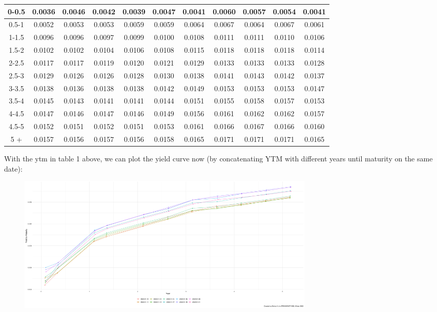 \documentclass[10pt]{article}
\begin{document}
\begin{enumerate}
\begin{enumerate}
\begin{table}[H]
{\begin{tabular}{|c|c|c|c|c|c|c|c|c|c|c|}
                    0-0.5 & 0.0036 & 0.0046 & 0.0042 & 0.0039 & 0.0047 & 0.0041 & 0.0060 & 0.0057 & 0.0054 & 0.0041 \\\hline
                    0.5-1 & 0.0052 & 0.0053 & 0.0053 & 0.0059 & 0.0059 & 0.0064 & 0.0067 & 0.0064 & 0.0067 & 0.0061 \\\hline
                    1-1.5 & 0.0096 & 0.0096 & 0.0097 & 0.0099 & 0.0100 & 0.0108 & 0.0111 & 0.0111 & 0.0110 & 0.0106 \\\hline
                    1.5-2 & 0.0102 & 0.0102 & 0.0104 & 0.0106 & 0.0108 & 0.0115 & 0.0118 & 0.0118 & 0.0118 & 0.0114 \\\hline
                    2-2.5 & 0.0117 & 0.0117 & 0.0119 & 0.0120 & 0.0121 & 0.0129 & 0.0133 & 0.0133 & 0.0133 & 0.0128 \\\hline
                    2.5-3 & 0.0129 & 0.0126 & 0.0126 & 0.0128 & 0.0130 & 0.0138 & 0.0141 & 0.0143 & 0.0142 & 0.0137 \\\hline
                    3-3.5 & 0.0138 & 0.0136 & 0.0138 & 0.0138 & 0.0142 & 0.0149 & 0.0153 & 0.0153 & 0.0153 & 0.0147 \\\hline
                    3.5-4 & 0.0145 & 0.0143 & 0.0141 & 0.0141 & 0.0144 & 0.0151 & 0.0155 & 0.0158 & 0.0157 & 0.0153 \\\hline
                    4-4.5 & 0.0147 & 0.0146 & 0.0147 & 0.0146 & 0.0149 & 0.0156 & 0.0161 & 0.0162 & 0.0162 & 0.0157 \\\hline
                    4.5-5 & 0.0152 & 0.0151 & 0.0152 & 0.0151 & 0.0153 & 0.0161 & 0.0166 & 0.0167 & 0.0166 & 0.0160 \\\hline
                    5 +   & 0.0157 & 0.0156 & 0.0157 & 0.0156 & 0.0158 & 0.0165 & 0.0171 & 0.0171 & 0.0171 & 0.0165 \\\hline
                \end{tabular}}
            \end{table}
            With the ytm in table 1 above, we can plot the yield curve now (by concatenating YTM with different years until maturity on the same date): 
            \begin{figure}[H]
                \centering
                \includegraphics[width=0.7\textwidth]{yield curve.png}

\end{figure}
\end{enumerate}
\end{enumerate}
\end{document}
